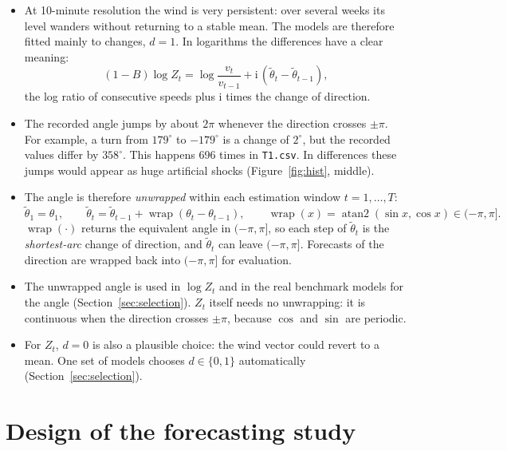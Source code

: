 \documentclass[11pt,a4paper]{article}
\newcommand{\iu}{\mathrm{i}}
\newcommand{\code}[1]{\texttt{#1}}
\DeclareMathOperator{\wrap}{wrap}
\begin{document}
\begin{itemize}
  \item At 10-minute resolution the wind is very persistent: over several weeks its level wanders
    without returning to a stable mean. The models are therefore fitted mainly to changes,
    $d = 1$. In logarithms the differences have a clear meaning:
    \begin{equation}
      (1-B)\log Z_t = \log\frac{v_t}{v_{t-1}} + \iu\,(\tilde\theta_t - \tilde\theta_{t-1}),
    \end{equation}
    the log ratio of consecutive speeds plus $\iu$ times the change of direction.
  \item The recorded angle jumps by about $2\pi$ whenever the direction crosses $\pm\pi$. For
    example, a turn from $179^\circ$ to $-179^\circ$ is a change of $2^\circ$, but the recorded
    values differ by $358^\circ$. This happens 696 times in \code{T1.csv}. In differences these
    jumps would appear as huge artificial shocks (Figure~\ref{fig:hist}, middle).
  \item The angle is therefore \emph{unwrapped} within each estimation window $t = 1, \dots, T$:
    \begin{equation}\label{eq:unwrap}
      \tilde\theta_1 = \theta_1, \qquad
      \tilde\theta_t = \tilde\theta_{t-1} + \wrap(\theta_t - \theta_{t-1}), \qquad
      \wrap(x) = \operatorname{atan2}(\sin x, \cos x) \in (-\pi, \pi].
    \end{equation}
    $\wrap(\cdot)$ returns the equivalent angle in $(-\pi, \pi]$, so each step of $\tilde\theta_t$
    is the \emph{shortest-arc} change of direction, and $\tilde\theta_t$ can leave $(-\pi, \pi]$.
    Forecasts of the direction are wrapped back into $(-\pi, \pi]$ for evaluation.
  \item The unwrapped angle is used in $\log Z_t$ and in the real benchmark models for the
    angle (Section~\ref{sec:selection}). $Z_t$ itself needs no unwrapping: it is continuous when
    the direction crosses $\pm\pi$, because $\cos$ and $\sin$ are periodic.
  \item For $Z_t$, $d = 0$ is also a plausible choice: the wind vector could revert to a mean.
    One set of models chooses $d \in \{0, 1\}$ automatically (Section~\ref{sec:selection}).
\end{itemize}

\section{Design of the forecasting study}\label{sec:design}
\end{document}
